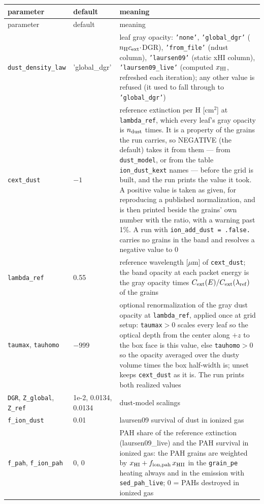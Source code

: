 \documentclass[english,a4paper]{my_memo}
\newcommand{\code}[1]{\texttt{#1}}
\begin{document}
{\small
\begin{longtable}{llp{7.2cm}}
\toprule
parameter & default & meaning \\
\midrule
\endfirsthead
\toprule
parameter & default & meaning \\
\midrule
\endhead
\bottomrule
\endlastfoot
\code{dust\_density\_law} & 'global\_dgr' & leaf gray opacity: \code{'none'}, \code{'global\_dgr'} ($n_{\rm H}c_{\rm ext}{\cdot}$DGR), \code{'from\_file'} (ndust column), \code{'laursen09'} (static xHI column), \code{'laursen09\_live'} (computed $x_{\rm HI}$, refreshed each iteration); any other value is refused (it used to fall through to \code{'global\_dgr'}) \\
\code{cext\_dust} & $-1$ & reference extinction per H [cm$^2$] at \code{lambda\_ref}, which every leaf's gray opacity is $n_{\rm dust}$ times.  It is a property of the grains the run carries, so NEGATIVE (the default) takes it from them --- from \code{dust\_model}, or from the table \code{ion\_dust\_kext} names --- before the grid is built, and the run prints the value it took.  A positive value is taken as given, for reproducing a published normalization, and is then printed beside the grains' own number with the ratio, with a warning past 1\%.  A run with \code{ion\_add\_dust = .false.} carries no grains in the band and resolves a negative value to 0 \\
\code{lambda\_ref} & 0.55 & reference wavelength [$\mu$m] of \code{cext\_dust}; the band opacity at each packet energy is the gray opacity times $C_{\rm ext}(E)/C_{\rm ext}(\lambda_{\rm ref})$ of the grains \\
\code{taumax}, \code{tauhomo} & $-999$ & optional renormalization of the gray dust opacity at \code{lambda\_ref}, applied once at grid setup: \code{taumax}$>0$ scales every leaf so the optical depth from the center along $+z$ to the box face is this value, else \code{tauhomo}$>0$ so the opacity averaged over the dusty volume times the box half-width is; unset keeps \code{cext\_dust} as it is.  The run prints both realized values \\
\code{DGR}, \code{Z\_global}, \code{Z\_ref} & 1e-2, 0.0134, 0.0134 & dust-model scalings \\
\code{f\_ion\_dust} & 0.01 & laursen09 survival of dust in ionized gas \\
\code{f\_pah}, \code{f\_ion\_pah} & 0, 0 & PAH share of the reference extinction (laursen09\_live) and the PAH survival in ionized gas: the PAH grains are weighted by $x_{\rm HI} + f_{\rm ion,pah}\,x_{\rm HII}$ in the \code{grain\_pe} heating always and in the emission with \code{sed\_pah\_live}; 0 = PAHs destroyed in ionized gas \\
\end{longtable}
}
\end{document}
